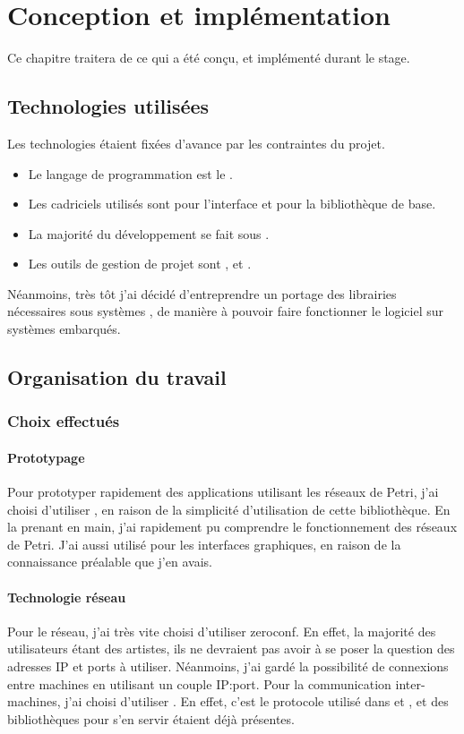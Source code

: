\chapter{Conception et implémentation}
\label{chapterImpl}

Ce chapitre traitera de ce qui a été conçu, et implémenté durant le stage.
\section{Technologies utilisées}
Les technologies étaient fixées d'avance par les contraintes du projet.

\begin{itemize}
	\item Le langage de programmation est le .
	\item Les cadriciels utilisés sont  pour l'interface et  pour la bibliothèque de base.
	\item La majorité du développement se fait sous .
	\item Les outils de gestion de projet sont ,  et .
\end{itemize}

Néanmoins, très tôt j'ai décidé d'entreprendre un portage des librairies nécessaires sous systèmes , de manière à pouvoir faire fonctionner le logiciel sur systèmes embarqués.

\section{Organisation du travail}
\subsection{Choix effectués}
\subsubsection{Prototypage}
Pour prototyper rapidement des applications utilisant les réseaux de Petri, j'ai choisi d'utiliser , en raison de la simplicité d'utilisation de cette bibliothèque. En la prenant en main, j'ai rapidement pu comprendre le fonctionnement des réseaux de Petri.
J'ai aussi utilisé  pour les interfaces graphiques, en raison de la connaissance préalable que j'en avais.

\subsubsection{Technologie réseau}
Pour le réseau, j'ai très vite choisi d'utiliser \gls{zeroconf}. En effet, la majorité des utilisateurs étant des artistes, ils ne devraient pas avoir à se poser la question des adresses IP et ports à utiliser.
Néanmoins, j'ai gardé la possibilité de connexions entre machines en utilisant un couple IP:port.
Pour la communication inter-machines, j'ai choisi d'utiliser . En effet, c'est le protocole utilisé dans  et , et des bibliothèques pour s'en servir étaient déjà présentes.

